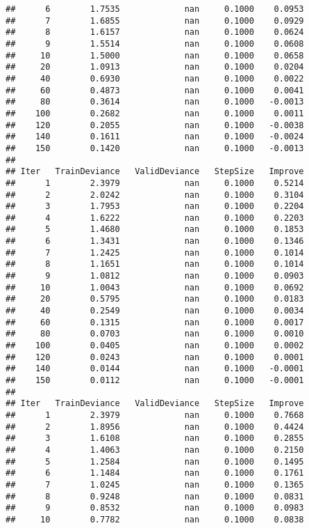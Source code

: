 \documentclass[]{article}
\begin{document}
\begin{verbatim}
##      6        1.7535             nan     0.1000    0.0953
##      7        1.6855             nan     0.1000    0.0929
##      8        1.6157             nan     0.1000    0.0624
##      9        1.5514             nan     0.1000    0.0608
##     10        1.5000             nan     0.1000    0.0658
##     20        1.0913             nan     0.1000    0.0204
##     40        0.6930             nan     0.1000    0.0022
##     60        0.4873             nan     0.1000    0.0041
##     80        0.3614             nan     0.1000   -0.0013
##    100        0.2682             nan     0.1000    0.0011
##    120        0.2055             nan     0.1000   -0.0038
##    140        0.1611             nan     0.1000   -0.0024
##    150        0.1420             nan     0.1000   -0.0013
## 
## Iter   TrainDeviance   ValidDeviance   StepSize   Improve
##      1        2.3979             nan     0.1000    0.5214
##      2        2.0242             nan     0.1000    0.3104
##      3        1.7953             nan     0.1000    0.2204
##      4        1.6222             nan     0.1000    0.2203
##      5        1.4680             nan     0.1000    0.1853
##      6        1.3431             nan     0.1000    0.1346
##      7        1.2425             nan     0.1000    0.1014
##      8        1.1651             nan     0.1000    0.1014
##      9        1.0812             nan     0.1000    0.0903
##     10        1.0043             nan     0.1000    0.0692
##     20        0.5795             nan     0.1000    0.0183
##     40        0.2549             nan     0.1000    0.0034
##     60        0.1315             nan     0.1000    0.0017
##     80        0.0703             nan     0.1000    0.0010
##    100        0.0405             nan     0.1000    0.0002
##    120        0.0243             nan     0.1000    0.0001
##    140        0.0144             nan     0.1000   -0.0001
##    150        0.0112             nan     0.1000   -0.0001
## 
## Iter   TrainDeviance   ValidDeviance   StepSize   Improve
##      1        2.3979             nan     0.1000    0.7668
##      2        1.8956             nan     0.1000    0.4424
##      3        1.6108             nan     0.1000    0.2855
##      4        1.4063             nan     0.1000    0.2150
##      5        1.2584             nan     0.1000    0.1495
##      6        1.1484             nan     0.1000    0.1761
##      7        1.0245             nan     0.1000    0.1365
##      8        0.9248             nan     0.1000    0.0831
##      9        0.8532             nan     0.1000    0.0983
##     10        0.7782             nan     0.1000    0.0838

\end{verbatim}
\end{document}

